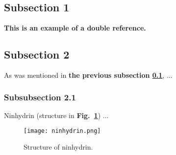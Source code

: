 \subsection{Subsection 1}
\label{sec:subsection1}
\textbf{This is an example of a double reference.}\cite{Peace2005,Dai2014} 

\subsection{Subsection 2}
\label{sec:subsection2}

As was mentioned in \textbf{the previous subsection \ref{sec:subsection1}}, ...

\subsubsection{Subsubsection 2.1}
\label{sec:subsubsec2.1}

Ninhydrin (structure in \textbf{Fig.~\ref{fig:ninhydrin}}) ...

\begin{figure}[!ht]
  \centering
 \texttt{[image: ninhydrin.png]}
 \caption{Structure of ninhydrin.}
 \label{fig:ninhydrin}
\end{figure}